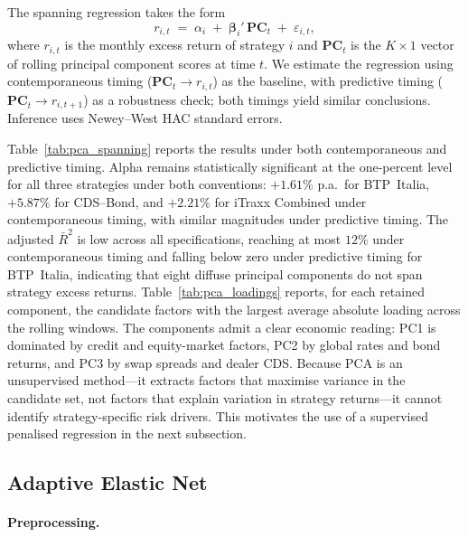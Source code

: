The spanning regression takes the form
\[
r_{i,t} \;=\; \alpha_i \;+\; \boldsymbol{\beta}_i'\,
\mathbf{PC}_t \;+\; \varepsilon_{i,t},
\]
where $r_{i,t}$ is the monthly excess return of strategy $i$ and
$\mathbf{PC}_t$ is the $K \times 1$ vector of rolling principal
component scores at time $t$. We estimate the regression using
contemporaneous timing ($\mathbf{PC}_t \to r_{i,t}$) as the baseline,
with predictive timing ($\mathbf{PC}_t \to r_{i,t+1}$) as a
robustness check; both timings yield similar conclusions. Inference
uses Newey--West HAC standard errors.

Table~\ref{tab:pca_spanning} reports the results under both
contemporaneous and predictive timing. Alpha remains statistically
significant at the one-percent level for all three strategies
under both conventions: $+1.61\%$ p.a.\ for BTP~Italia, 
$+5.87\%$ for CDS--Bond, and $+2.21\%$ for iTraxx Combined under 
contemporaneous timing, with similar magnitudes under predictive 
timing. The adjusted $\bar{R}^2$ is low across all specifications, reaching
at most $12\%$ under contemporaneous timing and falling below zero
under predictive timing for BTP~Italia, indicating that eight
diffuse principal components do not span strategy excess returns.
Table~\ref{tab:pca_loadings} reports, for each retained component, the candidate factors
with the largest average absolute loading across the rolling windows.
The components admit a clear economic reading: PC1 is dominated by
credit and equity-market factors, PC2 by global rates and bond returns,
and PC3 by swap spreads and dealer CDS. Because PCA is an unsupervised
method---it extracts factors that maximise variance in the
candidate set, not factors that explain variation in strategy
returns---it cannot identify strategy-specific risk drivers.
This motivates the use of a supervised penalised regression in
 the next subsection.


\subsection{Adaptive Elastic Net}
\label{sec:aen}

\paragraph{Preprocessing.}

